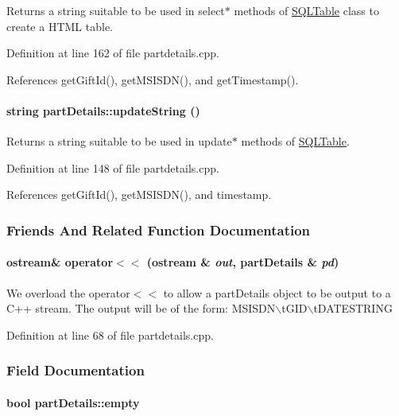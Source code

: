 Returns a string suitable to be used in select$\ast$ methods of \hyperlink{classSQLTable}{SQLTable} class to create a HTML table. 

Definition at line 162 of file partdetails.cpp.

References get\-Gift\-Id(), get\-MSISDN(), and get\-Timestamp().\hypertarget{classpartDetails_partDetailsa12}{
\paragraph[updateString]{\setlength{\rightskip}{0pt plus 5cm}string part\-Details::update\-String ()}\hfill}
\label{classpartDetails_partDetailsa12}


Returns a string suitable to be used in update$\ast$ methods of \hyperlink{classSQLTable}{SQLTable}. 

Definition at line 148 of file partdetails.cpp.

References get\-Gift\-Id(), get\-MSISDN(), and timestamp.

\subsubsection{Friends And Related Function Documentation}
\hypertarget{classpartDetails_partDetailsl0}{
\paragraph[operator$<$$<$]{\setlength{\rightskip}{0pt plus 5cm}ostream\& operator$<$$<$ (ostream \& {\em out}, part\-Details \& {\em pd})}\hfill}
\label{classpartDetails_partDetailsl0}


We overload the operator$<$$<$ to allow a part\-Details object to be output to a C++ stream. The output will be of the form: MSISDN$\backslash$t\-GID$\backslash$t\-DATESTRING 

Definition at line 68 of file partdetails.cpp.

\subsubsection{Field Documentation}
\hypertarget{classpartDetails_partDetailso3}{
\paragraph[empty]{\setlength{\rightskip}{0pt plus 5cm}bool part\-Details::empty}\hfill}
\label{classpartDetails_partDetailso3}




